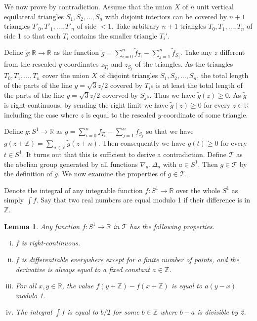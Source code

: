 \documentclass[a4paper]{amsart}
\theoremstyle{plain}
\newtheorem{lemma}{Lemma}
\theoremstyle{definition}
\begin{document}
We now prove  by contradiction. Assume that the union \(X\) of \(n\) unit vertical equilateral triangles \(S_1, S_2, \dots, S_n\) with disjoint interiors can be covered by \(n+1\) triangles \(T'_0, T'_1, \dots, T'_n\) of side \(< 1\). Take arbitrary \(n + 1\) triangles \(T_0, T_1, \dots, T_n\) of side 1 so that each \(T_i\) contains the smaller triangle \(T_i'\).

Define \(\tilde{g} : \mathbb{R} \to \mathbb{R}\) as the function \(\tilde{g} = \sum_{i=0}^n \tilde{f}_{T_i} - \sum_{j=1}^n \tilde{f}_{S_j}\). Take any \(z\) different from the rescaled \(y\)-coordinates \(z_{T_i}\) and \(z_{S_j}\) of the triangles. As the triangles \(T_0, T_1, \dots, T_n\) cover the union \(X\) of disjoint triangles \(S_1, S_2, \dots, S_n\), the total length of the parts of the line \(y = \sqrt{3}z/2\) covered by \(T_i\)\textquotesingle s is at least the total length of the parts of the line \(y = \sqrt{3}z/2\) coverved by \(S_j\)\textquotesingle s. Thus we have \(\tilde{g}(z) \geq 0\). As \(\tilde{g}\) is right-continuous, by sending the right limit we have \(\tilde{g}(z) \geq 0\) for every \(z \in \mathbb{R}\) including the case where \(z\) is equal to the rescaled \(y\)-coordinate of some triangle.

Define \(g : S^1 \to \mathbb{R}\) as \(g = \sum_{i=0}^n f_{T_i} - \sum_{j=1}^n f_{S_j}\) so that we have \(g(z + \mathbb{Z}) = \sum_{n \in \mathbb{Z}} \tilde{g}(z + n)\). Then consequently we have \(g(t) \geq 0\) for every \(t \in S^1\). 
It turns out that this is sufficient to derive a contradiction.
Define \(\mathcal{T}\) as the abelian group generated by all functions \(\nabla_a , \Delta_a\) with \(a \in S^1\). Then \(g \in \mathcal{T}\) by the definition of \(g\).
We now examine the properties of $g \in \mathcal{T}$.
 
Denote the integral of any integrable function \(f : S^1 \to \mathbb{R}\) over the whole \(S^1\) as simply \(\int f\).
Say that two real numbers are equal modulo 1 if their difference is in $\mathbb{Z}$.

\begin{lemma}

Any function \(f : S^1 \to \mathbb{R}\) in \(\mathcal{T}\) has the following properties.

\begin{enumerate}[(i)]
\item
  \(f\) is right-continuous.
\item
  \(f\) is differentiable everywhere except for a finite number of points, and the derivative is always equal to a fixed constant \(a \in \mathbb{Z}\).
\item
  For all \(x, y \in \mathbb{R}\), the value \(f(y + \mathbb{Z}) - f(x + \mathbb{Z})\) is equal to \(a(y - x)\) modulo 1.
\item
  The integral \(\int f\) is equal to \(b / 2\) for some \(b \in \mathbb{Z}\) where \(b - a\) is divisible by 2.
\end{enumerate}

\label{lem:triangle-group}
\end{lemma}
\end{document}
